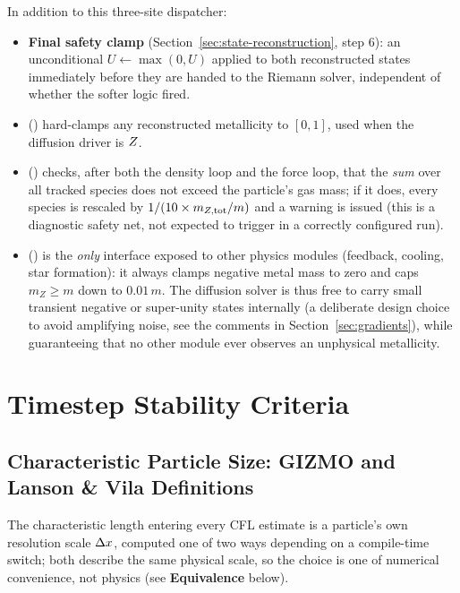 In addition to this three-site dispatcher:
\begin{itemize}
  \item \textbf{Final safety clamp} (Section~\ref{sec:state-reconstruction},
        step 6): an unconditional
        $U \gets \max(0,U)$ applied to both reconstructed states
        immediately before they are handed to the Riemann solver,
        independent of whether the softer  logic fired.
  \item {}
        () hard-clamps any
        reconstructed metallicity to $[0,1]$, used when the diffusion
        driver is $Z$.
  \item {}
        () checks, after both the
        density loop and the force loop, that the \emph{sum} over all
        tracked species does not exceed the particle's gas mass; if it
        does, every species is rescaled by $1/(10\times m_{Z,\rm
        tot}/m)$ and a warning is issued (this is a diagnostic
        safety net, not expected to trigger in a correctly configured
        run).
  \item {}
        () is the \emph{only} interface
        exposed to other physics modules (feedback, cooling, star
        formation): it always clamps negative metal mass to zero and
        caps $m_Z \geq m$ down to $0.01\,m$. The diffusion solver is
        thus free to carry small transient negative or super-unity
        states internally (a deliberate design choice to avoid
        amplifying noise, see the comments in
        Section~\ref{sec:gradients}), while guaranteeing that no other
        module ever observes an unphysical metallicity.
\end{itemize}

\section{Timestep Stability Criteria}
\label{sec:timestep}

\subsection{Characteristic Particle Size: GIZMO and Lanson \& Vila Definitions}
\label{sec:particle-size}
The characteristic length entering every CFL estimate is a particle's
own resolution scale $\Delta x$, computed one of two ways depending on a
compile-time switch; both describe the same physical scale, so the
choice is one of numerical convenience, not physics (see
\textbf{Equivalence} below).


